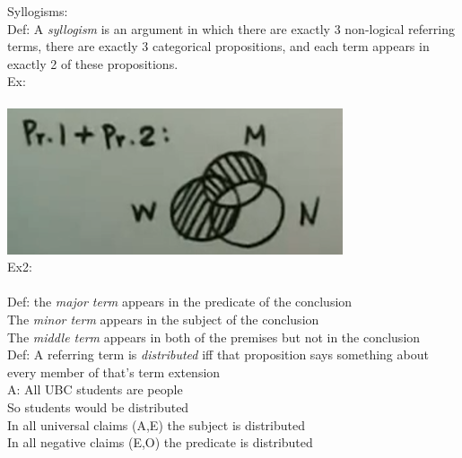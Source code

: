 Syllogisms:\\
Def: A \textit{syllogism} is an argument in which there are exactly 3 non-logical referring terms, there are exactly 3 categorical propositions, and each term appears in exactly 2 of these propositions.\\
Ex:\\
\\
\includegraphics[scale=0.7]{Phil120Pictures/image4.png}\\

Ex2:\\
\\
Def: the \textit{major term} appears in the predicate of the conclusion\\
The \textit{minor term} appears in the subject of the conclusion\\
The \textit{middle term} appears in both of the premises but not in the conclusion\\

Def: A referring term is \textit{distributed} iff that proposition says something about every member of that's term extension\\
A: All UBC students are people\\
So students would be distributed\\

In all universal claims (A,E) the subject is distributed\\
In all negative claims (E,O) the predicate is distributed\\

